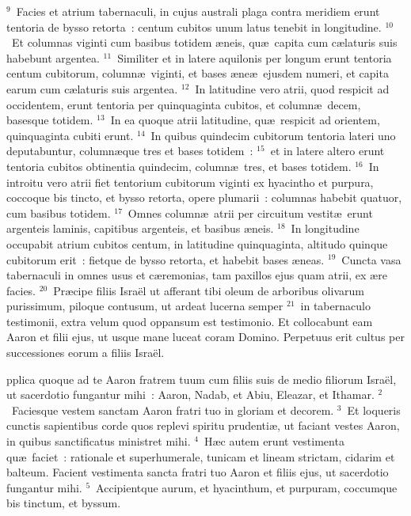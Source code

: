 ${}^{9}$~Facies et atrium tabernaculi, in cujus australi plaga contra meridiem erunt tentoria de bysso retorta~: centum cubitos unum latus tenebit in longitudine.
${}^{10}$~Et columnas viginti cum basibus totidem \ae neis, qu\ae\ capita cum c\ae laturis suis habebunt argentea.
${}^{11}$~Similiter et in latere aquilonis per longum erunt tentoria centum cubitorum, column\ae\ viginti, et bases \ae ne\ae\ ejusdem numeri, et capita earum cum c\ae laturis suis argentea.
${}^{12}$~In latitudine vero atrii, quod respicit ad occidentem, erunt tentoria per quinquaginta cubitos, et column\ae\ decem, basesque totidem.
${}^{13}$~In ea quoque atrii latitudine, qu\ae\ respicit ad orientem, quinquaginta cubiti erunt.
${}^{14}$~In quibus quindecim cubitorum tentoria lateri uno deputabuntur, column\ae que tres et bases totidem~:
${}^{15}$~et in latere altero erunt tentoria cubitos obtinentia quindecim, column\ae\ tres, et bases totidem.
${}^{16}$~In introitu vero atrii fiet tentorium cubitorum viginti ex hyacintho et purpura, coccoque bis tincto, et bysso retorta, opere plumarii~: columnas habebit quatuor, cum basibus totidem.
${}^{17}$~Omnes column\ae\ atrii per circuitum vestit\ae\ erunt argenteis laminis, capitibus argenteis, et basibus \ae neis.
${}^{18}$~In longitudine occupabit atrium cubitos centum, in latitudine quinquaginta, altitudo quinque cubitorum erit~: fietque de bysso retorta, et habebit bases \ae neas.
${}^{19}$~Cuncta vasa tabernaculi in omnes usus et c\ae remonias, tam paxillos ejus quam atrii, ex \ae re facies.
${}^{20}$~Pr\ae cipe filiis Isra\"el ut afferant tibi oleum de arboribus olivarum purissimum, piloque contusum, ut ardeat lucerna semper
${}^{21}$~in tabernaculo testimonii, extra velum quod oppansum est testimonio. Et collocabunt eam Aaron et filii ejus, ut usque mane luceat coram Domino. Perpetuus erit cultus per successiones eorum a filiis Isra\"el.

\bchapter
{}pplica quoque ad te Aaron fratrem tuum cum filiis suis de medio filiorum Isra\"el, ut sacerdotio fungantur mihi~: Aaron, Nadab, et Abiu, Eleazar, et Ithamar.
${}^{2}$~Faciesque vestem sanctam Aaron fratri tuo in gloriam et decorem.
${}^{3}$~Et loqueris cunctis sapientibus corde quos replevi spiritu prudenti\ae , ut faciant vestes Aaron, in quibus sanctificatus ministret mihi.
${}^{4}$~H\ae c autem erunt vestimenta qu\ae\ faciet~: rationale et superhumerale, tunicam et lineam strictam, cidarim et balteum. Facient vestimenta sancta fratri tuo Aaron et filiis ejus, ut sacerdotio fungantur mihi.
${}^{5}$~Accipientque aurum, et hyacinthum, et purpuram, coccumque bis tinctum, et byssum.


